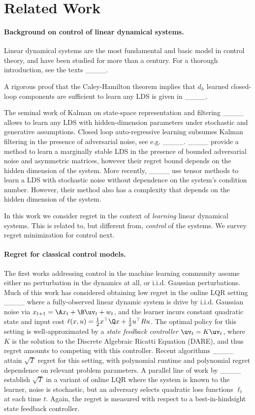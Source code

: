 \section{Related Work}
\paragraph{Background on control of linear dynamical systems.} 
Linear dynamical systems are the most fundamental and basic model in control theory, and have been studied for more than a century. For a thorough introduction, see the texts ____. 

A rigorous proof that the Caley-Hamilton theorem implies that $d_h$ learned closed-loop components are sufficient to learn any LDS is given in  ____. 


The seminal work of Kalman on state-space representation and filtering ____ allows to learn any LDS with hidden-dimension parameters under stochastic and generative assumptions. Closed loop auto-regressive learning subsumes Kalman filtering in the presence of adversarial noise, see e.g. ____. ____ provide a method to learn a marginally stable LDS in the presence of bounded adversarial noise and asymmetric matrices, however their regret bound depends on the hidden dimension of the system. More recently, ____ use tensor methods to learn a LDS with stochastic noise without dependence on the system's condition number. However, their method also has a complexity that depends on the hidden dimension of the system. 


In this work we consider regret in the context of {\it learning} linear dynamical systems. This is related to, but different from, {\it control} of the systems. We survey regret minimization for control next. 

\paragraph{Regret for classical control models. }
The first works addressing control in the machine learning community assume either no perturbation in the dynamics at all, or i.i.d. Gaussian perturbations. 
Much of this work has considered obtaining low regret in the online LQR setting ____ where a fully-observed linear dynamic system is drive by i.i.d. Gaussian noise via $x_{t+1} = \A x_t + \B \uv_t + w_t$, and the learner incurs constant quadratic state and input cost $\ell(x,u) = \frac{1}{2}x^\top \Q x + \frac{1}{2}u^\top R u$. The optimal policy for this setting is well-approximated by a \emph{state feedback controller} $\uv_t = K \uv_t$, where $K$ is the solution to the Discrete Algebraic Ricatti Equation (DARE), and thus regret amounts to competing with this controller. Recent algorithms ____ attain $\sqrt{T}$ regret for this setting, with polynomial runtime and polynomial regret dependence on relevant problem parameters. 
A parallel line of work by  ____ establish $\sqrt{T}$ in  a variant of online LQR where the system is known to the learner, noise is stochastic, but an adversary selects quadratic loss functions $\ell_t$ at each time $t$. Again, the regret is measured with respect to a best-in-hindsight state feedback controller.

